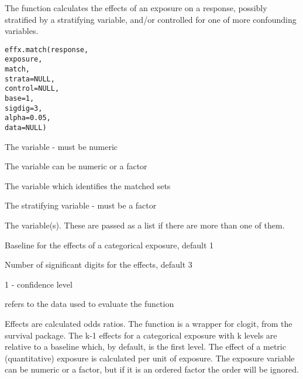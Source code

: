 \begin{Description}\relax
The function calculates the effects of an exposure on a response,
possibly stratified by a stratifying variable, and/or controlled for one
of more confounding variables.
\end{Description}
\begin{Usage}
\begin{verbatim}
effx.match(response,
exposure,
match,
strata=NULL,
control=NULL,
base=1,
sigdig=3,
alpha=0.05,
data=NULL) 
\end{verbatim}
\end{Usage}
\begin{Arguments}
\begin{ldescription}
\item[\code{response}] The  variable - must be numeric
\item[\code{exposure}] The  variable can be numeric or a factor
\item[\code{match}] The variable which identifies the matched sets
\item[\code{strata}] The  stratifying variable - must be a factor
\item[\code{control}] The  variable(s). These are passed as a
list if there are more than one of them.
\item[\code{base}] Baseline for the effects of a categorical exposure, default 1
\item[\code{sigdig}] Number of significant digits for the effects, default 3
\item[\code{alpha}] 1 - confidence level
\item[\code{data}]  refers to the data used to evaluate the function
\end{ldescription}
\end{Arguments}
\begin{Details}\relax
Effects are calculated odds ratios.
The function is a wrapper for clogit, from the survival package.
The k-1 effects for a categorical  exposure with k levels are relative 
to a baseline which, by default, is the first level. The effect of a metric (quantitative) 
exposure is calculated per unit of exposure.
The exposure variable can be numeric or a factor, but if it is an ordered factor the order will be ignored.
\end{Details}
